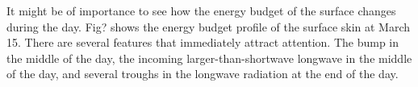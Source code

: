 \documentclass[a4paper,12pt]{article}
\numberwithin{equation}{section} %
\begin{document}

It might be of importance to see how the energy budget of the surface changes during the day. Fig? shows the energy budget profile of the surface skin at March 15. There are several features that immediately attract attention. The bump in the middle of the day, the incoming larger-than-shortwave longwave in the middle of the day, and several troughs in the longwave radiation at the end of the day.
\end{document}
